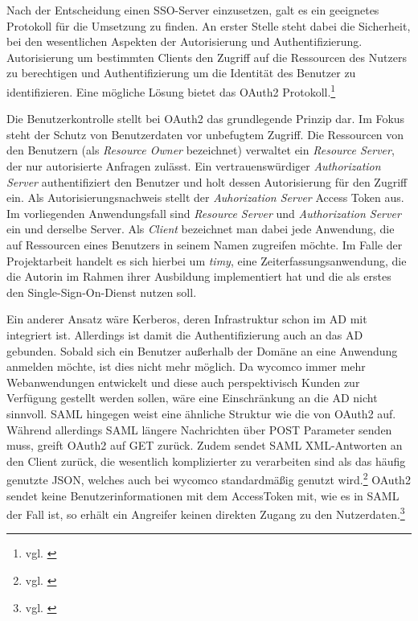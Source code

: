 Nach der Entscheidung einen \ac{SSO}-Server einzusetzen, galt es ein geeignetes Protokoll für die Umsetzung zu finden. An erster Stelle steht dabei die Sicherheit, bei den wesentlichen Aspekten der Autorisierung und Authentifizierung. Autorisierung um bestimmten Clients den Zugriff auf die Ressourcen des Nutzers zu berechtigen und Authentifizierung um die Identität des Benutzer zu identifizieren. Eine mögliche Lösung bietet das OAuth2 Protokoll.\footnote{vgl. \cite{OAuth2}}

Die Benutzerkontrolle stellt bei OAuth2 das grundlegende Prinzip dar. Im Fokus steht der Schutz von Benutzerdaten vor unbefugtem Zugriff. Die Ressourcen von den Benutzern (als \textit{Resource Owner} bezeichnet) verwaltet ein \textit{Resource Server}, der nur autorisierte Anfragen zulässt. Ein vertrauenswürdiger \textit{Authorization Server} authentifiziert den Benutzer und holt dessen Autorisierung für den Zugriff ein. Als Autorisierungsnachweis stellt der \textit{Auhorization Server} Access Token aus. Im vorliegenden Anwendungsfall sind \textit{Resource Server} und \textit{Authorization Server} ein und derselbe Server.
Als \textit{Client} bezeichnet man dabei jede Anwendung, die auf Ressourcen eines Benutzers in seinem Namen zugreifen möchte. Im Falle der Projektarbeit handelt es sich hierbei um \textit{timy}, eine Zeiterfassungsanwendung, die die Autorin im Rahmen ihrer Ausbildung implementiert hat und die als erstes den Single-Sign-On-Dienst nutzen soll. 

Ein anderer Ansatz wäre Kerberos, deren Infrastruktur schon im \ac{AD} mit integriert ist. Allerdings ist damit die Authentifizierung auch an das \ac{AD} gebunden. Sobald sich ein Benutzer außerhalb der Domäne an eine Anwendung anmelden möchte, ist dies nicht mehr möglich. Da wycomco immer mehr Webanwendungen entwickelt und diese auch perspektivisch Kunden zur Verfügung gestellt werden sollen, wäre eine Einschränkung an die \ac{AD} nicht sinnvoll. 
\acs{SAML} hingegen weist eine ähnliche Struktur wie die von OAuth2 auf. Während allerdings \acs{SAML} längere Nachrichten über POST Parameter senden muss, greift OAuth2 auf GET zurück. Zudem sendet \acs{SAML} \acs{XML}-Antworten an den Client zurück, die wesentlich komplizierter zu verarbeiten sind als das häufig genutzte \acs{JSON}, welches auch bei wycomco standardmäßig genutzt wird.\footnote{vgl. \cite{SSO-Vgl}}
OAuth2 sendet keine Benutzerinformationen mit dem AccessToken mit, wie es in \acs{SAML} der Fall ist, so erhält ein Angreifer keinen direkten Zugang zu den Nutzerdaten.\footnote{vgl. \cite{book}}

